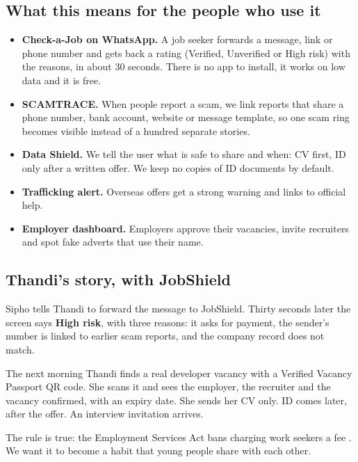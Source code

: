 \documentclass[11pt,a4paper]{article}
\begin{document}
\subsection{What this means for the people who use it}
\begin{itemize}
  \item \textbf{Check-a-Job on WhatsApp.} A job seeker forwards a message, link or phone number and gets back a rating (Verified, Unverified or High risk) with the reasons, in about 30 seconds. There is no app to install, it works on low data and it is free.
  \item \textbf{SCAMTRACE.} When people report a scam, we link reports that share a phone number, bank account, website or message template, so one scam ring becomes visible instead of a hundred separate stories.
  \item \textbf{Data Shield.} We tell the user what is safe to share and when: CV first, ID only after a written offer. We keep no copies of ID documents by default.
  \item \textbf{Trafficking alert.} Overseas offers get a strong warning and links to official help.
  \item \textbf{Employer dashboard.} Employers approve their vacancies, invite recruiters and spot fake adverts that use their name.
\end{itemize}

\subsection{Thandi's story, with JobShield}
Sipho tells Thandi to forward the message to JobShield. Thirty seconds later the screen says \textbf{High risk}, with three reasons: it asks for payment, the sender's number is linked to earlier scam reports, and the company record does not match.

The next morning Thandi finds a real developer vacancy with a Verified Vacancy Passport QR code. She scans it and sees the employer, the recruiter and the vacancy confirmed, with an expiry date. She sends her CV only. ID comes later, after the offer. An interview invitation arrives.

\begin{center}
\end{center}

The rule is true: the Employment Services Act bans charging work seekers a fee \cite{esa}. We want it to become a habit that young people share with each other.
\end{document}
